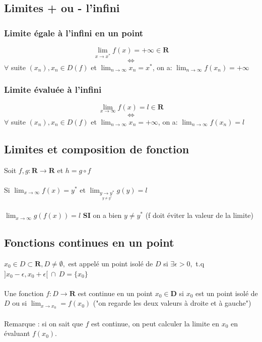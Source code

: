 \documentclass{article}
\begin{document}
\subsection{Limites + ou - l'infini}

\subsubsection{Limite égale à l'infini en un point}

\[ \lim_{x\to{x^*}} f(x) = +\infty \in \mathbf{R} \]
\[ \Leftrightarrow \]
$ \forall $ suite $ (x_n), x_n \in D(f) $ et $ \lim_{n\to\infty} x_n = x^* $, on a: $ \lim_{n\to\infty} f(x_n) = +\infty $

\subsubsection{Limite évaluée à l'infini}

\[ \lim_{x\to\infty} f(x) = l \in \mathbf{R} \]
\[ \Leftrightarrow \]
$ \forall $ suite $ (x_n), x_n \in D(f) $ et $ \lim_{n\to\infty} x_n = +\infty $, on a: $ \lim_{n\to\infty} f(x_n) = l $

\subsection{Limites et composition de fonction}

Soit $ f, g : \mathbf{R} \to \mathbf{R} $ et $ h = g \circ f $\\\\
Si $ \lim_{x\to\infty} f(x) = y^*$ et $ \lim_{\underset{y \neq y^*}{y \rightarrow y^*}} g(y) = l $\\\\
$ \lim_{x\to\infty} g(f(x)) = l $ \textbf{SI} on a bien $ y \neq y^* $ (f doit éviter la valeur de la limite)

\subsection{Fonctions continues en un point}

$ x_0 \in D \subset \mathbf{R}, D \neq \emptyset, $ est appelé un point isolé de $ D $ si $ \exists \epsilon > 0, $ t.q $ ]x_0 - \epsilon, x_0 + \epsilon[\ \cap\ D = \{ x_0 \}$\\\\
Une fonction $ f : D \to \mathbf{R} $ est continue en un point $ x_0 \in \mathbf{D} $ si $ x_0 $ est un point isolé de $ D $ ou si $ \lim_{x\to{x_0}} = f(x_0) $ ("on regarde les deux valeurs à droite et à gauche")\\\\
Remarque : si on sait que $ f $ est continue, on peut calculer la limite en $ x_0 $ en évaluant $ f(x_0) $.
\end{document}
